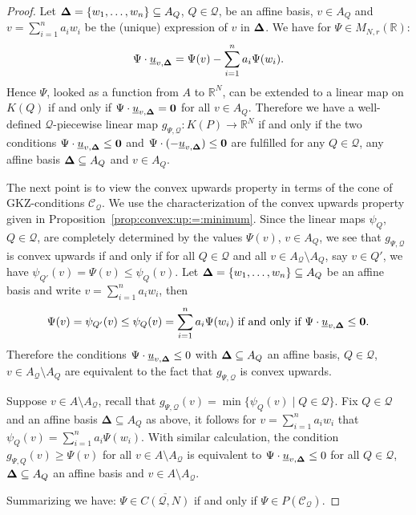 \documentclass[12pt, a4article]{amsart}   	%
\numberwithin{equation}{section}
\theoremstyle{plain}
\theoremstyle{definition}
\newcommand{\R}{{\mathbb R}}
\newcommand{\bfDelta}{{\bf \Delta}}
\newcommand{\mcC}{{\mathcal C}}
\newcommand{\mcQ}{{\mathcal Q}}
\newcommand{\uu}{{\underline u}}
\newcommand{\MNaR}{M_{N,r}(\R)}
\begin{document}
\begin{proof}
Let $\bfDelta=\{w_1,\ldots,w_n\}\subseteq A_Q$, $Q\in\mcQ$, be an affine basis, $v\in A_Q$ and $v=\sum_{i=1}^n a_iw_i$ be the (unique) expression of $v$ in $\bfDelta$. We have for $\Psi\in\MNaR$:
$$\Psi\cdot\uu_{v,\bfDelta} = \Psi(v) - \sum_{i=1}^n a_i\Psi(w_i).$$
Hence $\Psi$, looked as a function from $A$ to $\mathbb{R}^N$, can be extended to a linear map on $K(Q)$ if and only if $\Psi\cdot\uu_{v,\bfDelta} = \mathbf 0$ for all $ v\in A_Q$. Therefore we have a well-defined $\mathcal Q$-piecewise linear map $g_{\Psi,\mathcal Q}:K(P)\rightarrow \mathbb R^N$ if and only if the two conditions  $\Psi\cdot\uu_{v,\bfDelta} \leq \mathbf 0$ and $\Psi\cdot(-\uu_{v,\bfDelta}) \leq \mathbf 0$ are fulfilled for any $Q\in\mathcal{Q}$, any affine basis $\bfDelta\subseteq A_Q$ and $v\in A_Q$.
    
The next point is to view the convex upwards property in terms of the cone of GKZ-conditions $\mcC_\mcQ$. We use the characterization of the convex upwards property given in Proposition~\ref{prop:convex:up:=:minimum}. Since the linear maps $\psi_Q$, $Q\in\mcQ$, are completely
determined by the values $\Psi(  v)$, $  v\in A_Q$, we see that $g_{\Psi,\mathcal Q}$ is convex upwards if and only if for all $Q\in \mathcal Q$ and all $v\in A_\mcQ\setminus A_Q$, say $v\in Q'$, we have $\psi_{Q'}(v)=\Psi(v)\le \psi_{Q}(v)$. Let $\bfDelta=\{w_1,\ldots,w_n\} \subseteq A_Q$ be an affine basis and write $v=\sum_{i=1}^n a_iw_i$, then 
$$\Psi({v})=\psi_{Q'}(v)\leq\psi_{Q}(v)=\sum_{i=1}^n a_i\Psi(w_i) \text{ if and only if }\Psi\cdot\uu_{v,\bfDelta} \le \mathbf 0.$$
Therefore the conditions $\Psi\cdot \uu_{v,\bfDelta}\le 0$ with $\bfDelta\subseteq A_Q$ an affine basis, $Q\in \mcQ$,  $ v\in A_\mcQ\setminus A_Q$ are equivalent to the fact that $g_{\Psi,\mathcal Q}$ is convex upwards.
    
Suppose $v\in A\setminus A_\mcQ$, recall that $g_{\Psi,\mathcal{Q}}(v)=\min\{\psi_{Q}(  v)\mid Q\in \mathcal Q\}$. Fix $Q\in \mcQ$ and an affine basis $\mathbf{\Delta}\subseteq A_Q$ as above, it follows for $v=\sum_{i=1}^n a_iw_i$ that $\psi_{Q}(v)= \sum_{i=1}^n a_i\Psi(w_i)$. With similar calculation, the condition $g_{\Psi,Q}(v)\ge \Psi(v)$ for all  $v\in A\setminus A_\mcQ$ is equivalent to  $\Psi\cdot \uu_{v,\bfDelta}\le 0$ for all $Q\in \mcQ$, $\bfDelta\subseteq A_Q$ an affine basis and $ v\in A \setminus A_\mcQ$.

Summarizing we have: $\Psi\in\overline{C(\mcQ,N)}$ if and only if $\Psi\in P(\mcC_\mcQ)$.
\end{proof}
\end{document}
